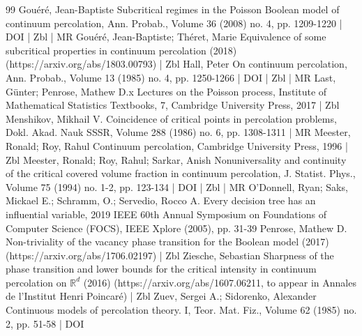 \begin{thebibliography}{99}
Gouéré, Jean-Baptiste Subcritical regimes in the Poisson Boolean model of continuum percolation, Ann. Probab., Volume 36 (2008) no. 4, pp. 1209-1220 | DOI | Zbl | MR
Gouéré, Jean-Baptiste; Théret, Marie Equivalence of some subcritical properties in continuum percolation (2018) (https://arxiv.org/abs/1803.00793) | Zbl
Hall, Peter On continuum percolation, Ann. Probab., Volume 13 (1985) no. 4, pp. 1250-1266 | DOI | Zbl | MR
Last, Günter; Penrose, Mathew D.x Lectures on the Poisson process, Institute of Mathematical Statistics Textbooks, 7, Cambridge University Press, 2017 | Zbl
Menshikov, Mikhail V. Coincidence of critical points in percolation problems, Dokl. Akad. Nauk SSSR, Volume 288 (1986) no. 6, pp. 1308-1311 | MR
Meester, Ronald; Roy, Rahul Continuum percolation, Cambridge University Press, 1996 | Zbl
Meester, Ronald; Roy, Rahul; Sarkar, Anish Nonuniversality and continuity of the critical covered volume fraction in continuum percolation, J. Statist. Phys., Volume 75 (1994) no. 1-2, pp. 123-134 | DOI | Zbl | MR
O’Donnell, Ryan; Saks, Mickael E.; Schramm, O.; Servedio, Rocco A. Every decision tree has an influential variable, 2019 IEEE 60th Annual Symposium on Foundations of Computer Science (FOCS), IEEE Xplore (2005), pp. 31-39
Penrose, Mathew D. Non-triviality of the vacancy phase transition for the Boolean model (2017) (https://arxiv.org/abs/1706.02197) | Zbl
Ziesche, Sebastian Sharpness of the phase transition and lower bounds for the critical intensity in continuum percolation on $\mathbb{R}^d$ (2016) (https://arxiv.org/abs/1607.06211, to appear in Annales de l’Institut Henri Poincaré) | Zbl
Zuev, Sergei A.; Sidorenko, Alexander Continuous models of percolation theory. I, Teor. Mat. Fiz., Volume 62 (1985) no. 2, pp. 51-58 | DOI
\end{thebibliography}
